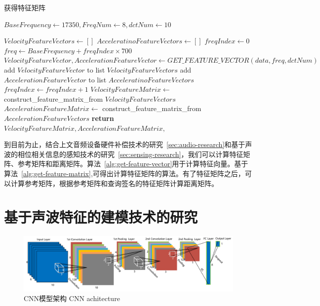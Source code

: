 \begin{algorithm}[!htp]
\caption{获得特征矩阵}
\label{alg:get-feature-matrix}
\begin{algorithmic}[1]
 
\State $BaseFrequency \gets 17350, FreqNum \gets 8, dctNum \gets 10$ 

\State $VelocityFeatureVectors \gets []$  
\State $AcceleratinoFeatureVectors \gets []$ 
\State $freqIndex \gets 0$ 
 
\State $freq \gets BaseFrequency + freqIndex\times 700$
\State $VelocityFeatureVector,AccelerationFeatureVector \gets  GET\_FEATURE\_VECTOR(data, freq, dctNum)$
\State add $VelocityFeatureVector$ to list $VelocityFeatureVectors$ 
\State add $AccelerationFeatureVector$ to list $AcceleratinoFeatureVectors$ 
\State $freqIndex \gets freqIndex + 1$
\EndWhile\label{euclidendwhile}
\State $VelocityFeatureMatrix \gets$ construct\_feature\_matrix\_from $VelocityFeatureVectors$ 
\State $AccelerationFeatureMatrix \gets$ construct\_feature\_matrix\_from $AccelerationFeatureVectors$ 
\State \textbf{return} $VelocityFeatureMatrix,AccelerationFeatureMatrix,$
\EndProcedure
\end{algorithmic}
\end{algorithm}

到目前为止，结合上文音频设备硬件补偿技术的研究~\ref{sec:audio-research}和基于声波的相位相关信息的感知技术的研究~\ref{sec:sensing-research}，我们可以计算特征矩阵、参考矩阵和距离矩阵。算法~\ref{alg:get-feature-vector}用于计算特征向量。基于算法~\ref{alg:get-feature-matrix},可得出计算特征矩阵的算法。有了特征矩阵之后，可以计算参考矩阵，根据参考矩阵和查询签名的特征矩阵计算距离矩阵。

\section{基于声波特征的建模技术的研究}

\begin{figure}[!htp]
  \centering
  \includegraphics[width=\textwidth]{figure/cnn-architecture.pdf}
  \bicaption
    {CNN模型架构}
    {CNN achitecture}
  \label{fig:cnn-architecture}
\end{figure}

